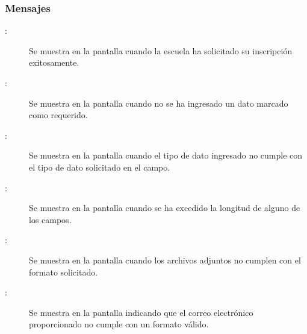 \subsubsection{Mensajes}
    \begin{description}
      \item[:] Se muestra en la pantalla  cuando la escuela ha solicitado su inscripción exitosamente.
      \item[:] Se muestra en la pantalla  cuando no se ha ingresado un dato marcado como requerido.
      \item[:] Se muestra en la pantalla  cuando el tipo de dato ingresado no cumple con el tipo de dato solicitado en el campo.
      \item[:] Se muestra en la pantalla  cuando se ha excedido la longitud de alguno de los campos.
      \item[:] Se muestra en la pantalla  cuando los archivos adjuntos no cumplen con el formato solicitado.
      \item[:] Se muestra en la pantalla  indicando que el correo electrónico proporcionado no cumple con un formato válido. 
    \end{description}
